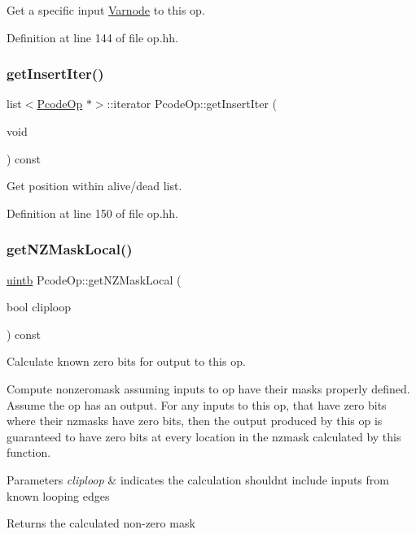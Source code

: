 Get a specific input \mbox{\hyperlink{class_varnode}{Varnode}} to this op. 



Definition at line 144 of file op.\+hh.

\mbox{\label{class_pcode_op_ab756db5a0f3c10576aa34fe6d65a8d16}} 
\subsubsection{\texorpdfstring{getInsertIter()}{getInsertIter()}}
{\footnotesize\ttfamily list$<$\mbox{\hyperlink{class_pcode_op}{Pcode\+Op}} $\ast$$>$\+::iterator Pcode\+Op\+::get\+Insert\+Iter (\begin{DoxyParamCaption}\item[{void}]{ }\end{DoxyParamCaption}) const\hspace{0.3cm}{\ttfamily [inline]}}



Get position within alive/dead list. 



Definition at line 150 of file op.\+hh.

\mbox{\label{class_pcode_op_a7c598d70b51160ff643b92a1619e1929}} 
\subsubsection{\texorpdfstring{getNZMaskLocal()}{getNZMaskLocal()}}
{\footnotesize\ttfamily \mbox{\hyperlink{types_8h_a2db313c5d32a12b01d26ac9b3bca178f}{uintb}} Pcode\+Op\+::get\+N\+Z\+Mask\+Local (\begin{DoxyParamCaption}\item[{bool}]{cliploop }\end{DoxyParamCaption}) const}



Calculate known zero bits for output to this op. 

Compute nonzeromask assuming inputs to op have their masks properly defined. Assume the op has an output. For any inputs to this op, that have zero bits where their nzmasks have zero bits, then the output produced by this op is guaranteed to have zero bits at every location in the nzmask calculated by this function. 
\begin{DoxyParams}{Parameters}
{\em cliploop} & indicates the calculation shouldn\textquotesingle{}t include inputs from known looping edges \\
\hline
\end{DoxyParams}
\begin{DoxyReturn}{Returns}
the calculated non-\/zero mask 
\end{DoxyReturn}


